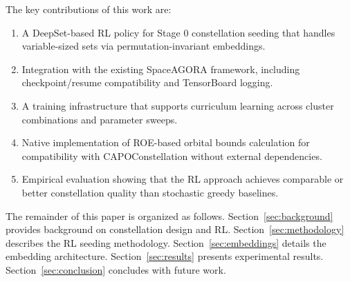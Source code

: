The key contributions of this work are:
\begin{enumerate}
    \item A DeepSet-based RL policy for Stage 0 constellation seeding that handles variable-sized sets via permutation-invariant embeddings.
    \item Integration with the existing SpaceAGORA framework, including checkpoint/resume compatibility and TensorBoard logging.
    \item A training infrastructure that supports curriculum learning across cluster combinations and parameter sweeps.
    \item Native implementation of ROE-based orbital bounds calculation for compatibility with CAPOConstellation without external dependencies.
    \item Empirical evaluation showing that the RL approach achieves comparable or better constellation quality than stochastic greedy baselines.
\end{enumerate}

The remainder of this paper is organized as follows. Section~\ref{sec:background} provides background on constellation design and RL. Section~\ref{sec:methodology} describes the RL seeding methodology. Section~\ref{sec:embeddings} details the embedding architecture. Section~\ref{sec:results} presents experimental results. Section~\ref{sec:conclusion} concludes with future work.
